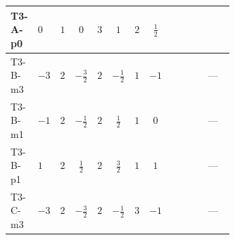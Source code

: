 \documentclass[8pt]{article}
\begin{document}
\begin{landscape}
\begin{longtable}{@{}llcccccc >{\raggedright\arraybackslash}p{0.21\linewidth} >{\raggedright\arraybackslash}p{0.21\linewidth} >{\raggedright\arraybackslash}p{0.21\linewidth}@{}}
\midrule
T3-A-p0 & $0$ & $1$ & $0$ & $3$ & $1$ & $2$ & $\frac{1}{2}$ & \scriptsize\adjustbox{max width=\linewidth}{$\begin{gathered} +4 {\lambda_{HS_2}^{(1)}}^2\end{gathered}$} & \scriptsize\adjustbox{max width=\linewidth}{$\begin{gathered} +8 {\lambda_{HS_2}^{(1)}} {\lambda_{S_2}^{(1)}}\end{gathered}$} & \scriptsize\adjustbox{max width=\linewidth}{$\begin{gathered} +6 {\lambda_{HS_2}^{(A)}}^2\end{gathered}$} \\
\midrule
T3-B-m3 & $-3$ & $2$ & $-\frac{3}{2}$ & $2$ & $-\frac{1}{2}$ & $1$ & $-1$ & \scriptsize\adjustbox{max width=\linewidth}{$\begin{gathered} +4 {\lambda_{HS_2}^{(1)}}^2\end{gathered}$} & \scriptsize\adjustbox{max width=\linewidth}{$\begin{gathered} +6 {\lambda_{HS_2}^{(1)}} {\lambda_{S_2}^{(1)}}\end{gathered}$} & --- \\
\midrule
T3-B-m1 & $-1$ & $2$ & $-\frac{1}{2}$ & $2$ & $\frac{1}{2}$ & $1$ & $0$ & \scriptsize\adjustbox{max width=\linewidth}{$\begin{gathered} +4 {\lambda_{HS_2}^{(1)}}^2\end{gathered}$} & \scriptsize\adjustbox{max width=\linewidth}{$\begin{gathered} +6 {\lambda_{HS_2}^{(1)}} {\lambda_{S_2}^{(1)}}\end{gathered}$} & --- \\
\midrule
T3-B-p1 & $1$ & $2$ & $\frac{1}{2}$ & $2$ & $\frac{3}{2}$ & $1$ & $1$ & \scriptsize\adjustbox{max width=\linewidth}{$\begin{gathered} +4 {\lambda_{HS_2}^{(1)}}^2\end{gathered}$} & \scriptsize\adjustbox{max width=\linewidth}{$\begin{gathered} +6 {\lambda_{HS_2}^{(1)}} {\lambda_{S_2}^{(1)}}\end{gathered}$} & --- \\
\midrule
T3-C-m3 & $-3$ & $2$ & $-\frac{3}{2}$ & $2$ & $-\frac{1}{2}$ & $3$ & $-1$ & \scriptsize\adjustbox{max width=\linewidth}{$\begin{gathered} +4 {\lambda_{HS_2}^{(1)}}^2\end{gathered}$} & \scriptsize\adjustbox{max width=\linewidth}{$\begin{gathered} +6 {\lambda_{HS_2}^{(1)}} {\lambda_{S_2}^{(1)}}\end{gathered}$} & --- \\

\end{longtable}
\end{landscape}
\end{document}
